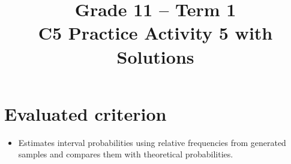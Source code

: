 
\makeatletter
{}
\makeatother






\usepackage{longtable}


\setlength{\DistributionGraphWidth}{0.6\textwidth}
\setlength{\DistributionGraphHeight}{6cm}

\title{Grade 11 -- Term 1 \\ C5 Practice Activity 5 with Solutions}
\author{}
\date{}

\pagestyle{empty}


\newcommand{\SolvedGraph}[2]{%
	\par\smallskip
	\Needspace{4.6cm}%
	\begin{center}
		\textbf{\small #1}\par\vspace{-1mm}
		\begin{minipage}{\textwidth}
			#2
		\end{minipage}%
	\end{center}
	\vspace{-2mm}%
}

\newcommand{\SolutionStage}[2]{%
	\Needspace{6\baselineskip}%
	\subsubsection{#2}%
}



	\maketitle
	\setcounter{tocdepth}{1}
	\setcounter{secnumdepth}{2}
	\label{toc}
	\tableofcontents
	
	\section*{Evaluated criterion}
	\begin{itemize}
		\item [\textbf{C6.}] Estimates interval probabilities using relative frequencies from generated samples and compares them with theoretical probabilities.
	\end{itemize}
	
